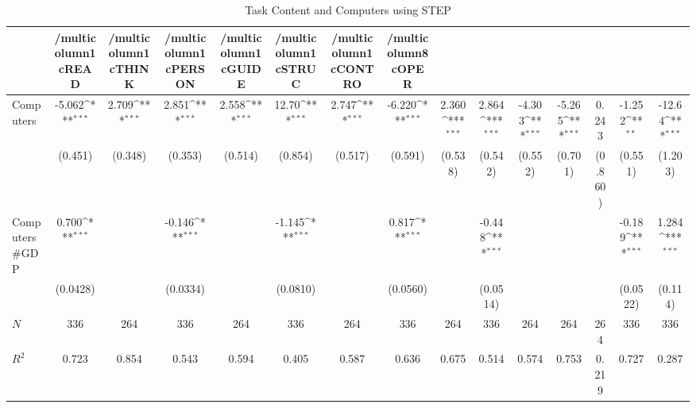 \begin{table}[htbp]\centering
\def\sym#1{\ifmmode^{#1}\else\(^{#1}\)\fi}
\caption{Task Content and Computers using STEP}
\begin{tabular}{l*{14}{c}}
\hline\hline
            &/multicolumn{1}{c}{READ}&/multicolumn{1}{c}{THINK}&/multicolumn{1}{c}{PERSON}&/multicolumn{1}{c}{GUIDE}&/multicolumn{1}{c}{STRUC}&/multicolumn{1}{c}{CONTRO}&/multicolumn{8}{c}{OPER}                                                                                                                                                       \\
\hline
Computers   &      -5.062\sym{***}&       2.709\sym{***}&       2.851\sym{***}&       2.558\sym{***}&       12.70\sym{***}&       2.747\sym{***}&      -6.220\sym{***}&       2.360\sym{***}&       2.864\sym{***}&      -4.303\sym{***}&      -5.265\sym{***}&       0.243         &      -1.252\sym{**} &      -12.64\sym{***}\\
            &     (0.451)         &     (0.348)         &     (0.353)         &     (0.514)         &     (0.854)         &     (0.517)         &     (0.591)         &     (0.538)         &     (0.542)         &     (0.552)         &     (0.701)         &     (0.860)         &     (0.551)         &     (1.203)         \\
[1em]
Computers#GDP&       0.700\sym{***}&                     &      -0.146\sym{***}&                     &      -1.145\sym{***}&                     &       0.817\sym{***}&                     &      -0.448\sym{***}&                     &                     &                     &      -0.189\sym{***}&       1.284\sym{***}\\
            &    (0.0428)         &                     &    (0.0334)         &                     &    (0.0810)         &                     &    (0.0560)         &                     &    (0.0514)         &                     &                     &                     &    (0.0522)         &     (0.114)         \\
\hline
\(N\)       &         336         &         264         &         336         &         264         &         336         &         264         &         336         &         264         &         336         &         264         &         264         &         264         &         336         &         336         \\
\(R^{2}\)   &       0.723         &       0.854         &       0.543         &       0.594         &       0.405         &       0.587         &       0.636         &       0.675         &       0.514         &       0.574         &       0.753         &       0.219         &       0.727         &       0.287         \\
\hline\hline
\end{tabular}
\end{table}
